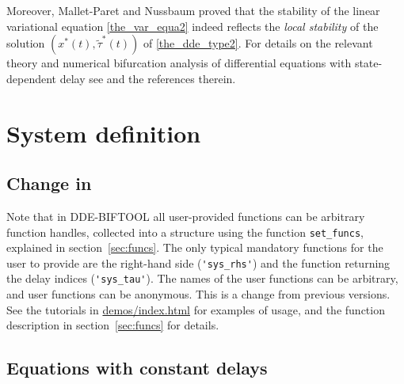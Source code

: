 \documentclass[10pt]{scrartcl}
\newcommand{\DDEBIFCODE}{\textsc{DDE-BIFTOOL}}
\newcommand{\demobase}{\url{demos/index.html}}
\newcommand{\blist}[1]{\mbox{\lstinline!#1!}}
\begin{document}

Moreover, Mallet-Paret and Nussbaum \cite{MN11} proved that the
stability of the linear variational equation \eqref{the_var_equa2}
indeed reflects the {\it local stability} of the solution
$(x^*(t),\tilde{\tau}^*(t))$ of \eqref{the_dde_type2}. 
For details on the relevant theory and numerical bifurcation analysis
of differential equations with state-dependent delay see
\cite{luz01,HKWW06} and the references therein.

\section{System definition}\label{sec:system:def}
\subsection{Change in \version} Note that in \DDEBIFCODE{} \version{}
all user-provided functions can be arbitrary function handles,
collected into a structure using the function \blist{set_funcs},
explained in section~\ref{sec:funcs}. The only typical mandatory
functions for the user to provide are the right-hand side
(\blist{'sys_rhs'}) and the function returning the delay indices
(\blist{'sys_tau'}). The names of the user functions can be arbitrary,
and user functions can be anonymous. This is a change from previous
versions. See the tutorials in \demobase{} for examples of
usage, and the function description in section~\ref{sec:funcs} for
details.
\subsection{Equations with constant delays}\label{sys_def1}
\end{document}
